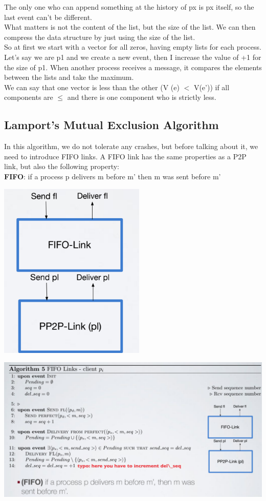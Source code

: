 \documentclass[11pt, a4paper]{article}
\begin{document}
The only one who can append something at the history of px is px itself, so the
last event can't be different.\\
What matters is not the content of the list, but the size of the list. We can then
compress the data structure by just using the size of the list.\\
So at first we start with a vector for all zeros, having empty lists for each process.\\
Let's say we are p1 and we create a new event, then I increase the value of +1 for
the size of p1. When another process receives a message, it compares the elements
between the lists and take the maximum.\\
We can say that one vector is less than the other (V (e) $<$ V(e')) if all components
are $\leq$ and there is one component who is strictly less.
\subsection{Lamport's Mutual Exclusion Algorithm}
In this algorithm, we do not tolerate any crashes, but before talking about it, we need to introduce FIFO links.
A FIFO link has the same properties as a P2P link, but also the following property:\\
\textbf{FIFO}: if a process p delivers m before m' then m was sent before m'\\
\begin{center}
    \includegraphics[scale=0.5]{img/links/FIFO1.png}
\end{center}
\begin{center}
    \includegraphics[scale=0.5]{img/links/FIFOalgo.png}
\end{center}
\end{document}
